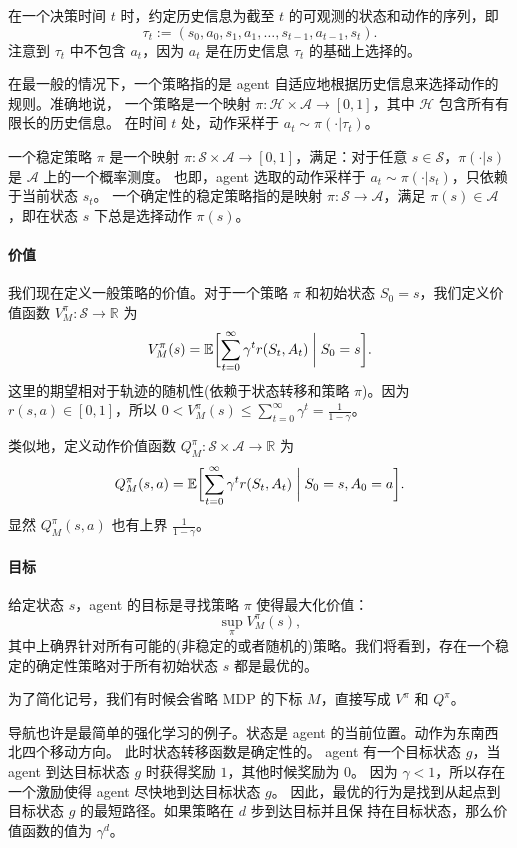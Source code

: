 \documentclass[fontset=none,zihao=-4]{Notes}
\begin{document}
在一个决策时间 $t$ 时，约定历史信息为截至 $t$ 的可观测的状态和动作的序列，即
\[
  \tau_t:=(s_0,a_0,s_1,a_1,\dots,s_{t-1},a_{t-1},s_t).
\]
注意到 $\tau_t$ 中不包含 $a_t$，因为 $a_t$ 是在历史信息 $\tau_t$ 的基础上选择的。

在最一般的情况下，一个策略指的是 agent 自适应地根据历史信息来选择动作的规则。准确地说，
一个策略是一个映射 $\pi:\mathcal H\times \mathscr A \to [0,1]$，其中 $\mathcal H$ 包含所有有限长的历史信息。
在时间 $t$ 处，动作采样于 $ a_t\sim \pi(\cdot|\tau_t)$。

一个稳定策略 $\pi$ 是一个映射 $\pi:\mathcal S\times \mathscr A \to [0,1]$，满足：对于任意 $s\in \mathcal S$，$\pi(\cdot|s)$ 是 $\mathcal A$ 上的一个概率测度。
也即，agent 选取的动作采样于 $a_t\sim \pi(\cdot|s_t)$，只依赖于当前状态 $s_t$。
一个确定性的稳定策略指的是映射 $\pi:\mathcal S \to \mathcal A$，满足 $\pi(s)\in \mathcal A$，即在状态 $s$ 下总是选择动作 $\pi(s)$。

\paragraph{价值} 我们现在定义一般策略的价值。对于一个策略 $\pi$ 和初始状态 $S_0=s$，我们定义价值函数 $V^\pi_M: \mathcal S \to \mathbb{R}$ 为
\[
  V_M^\pi(s)= \mathbb{E}\biggl[
    \sum_{t=0}^\infty \gamma^t r(S_t,A_t) \biggm| S_0=s
  \biggr].
\]
这里的期望相对于轨迹的随机性(依赖于状态转移和策略 $\pi$)。因为 $r(s,a)\in [0,1]$，所以
$ 0<V_M^\pi(s)\leq \sum_{t=0}^\infty \gamma^t = \frac{1}{1-\gamma}$。

类似地，定义动作价值函数 $Q^\pi_M:\mathcal S\times \mathcal A \to \mathbb{R}$ 为
\[
  Q_M^\pi(s,a) = \mathbb{E}\biggl[
    \sum_{t=0}^\infty \gamma^t r(S_t,A_t) \biggm| S_0=s, A_0=a
  \biggr].
\]
显然 $Q_M^\pi(s,a)$ 也有上界 $\frac{1}{1-\gamma}$。

\paragraph{目标} 给定状态 $s$，agent 的目标是寻找策略 $\pi$ 使得最大化价值：
\begin{equation}
  \sup_\pi V_M^\pi(s),
\end{equation}
其中上确界针对所有可能的(非稳定的或者随机的)策略。我们将看到，存在一个稳定的确定性策略对于所有初始状态 $s$ 
都是最优的。

为了简化记号，我们有时候会省略 MDP 的下标 $M$，直接写成 $V^\pi$ 和 $Q^\pi$。

\begin{example}[导航]
  导航也许是最简单的强化学习的例子。状态是 agent 的当前位置。动作为东南西北四个移动方向。
  此时状态转移函数是确定性的。
  agent 有一个目标状态 $g$，当 agent 到达目标状态 $g$ 时获得奖励 $1$，其他时候奖励为 $0$。
  因为 $\gamma <1$，所以存在一个激励使得 agent 尽快地到达目标状态 $g$。
  因此，最优的行为是找到从起点到目标状态 $g$ 的最短路径。如果策略在 $d$ 步到达目标并且保
  持在目标状态，那么价值函数的值为 $\gamma^d$。
\end{example}
\end{document}
